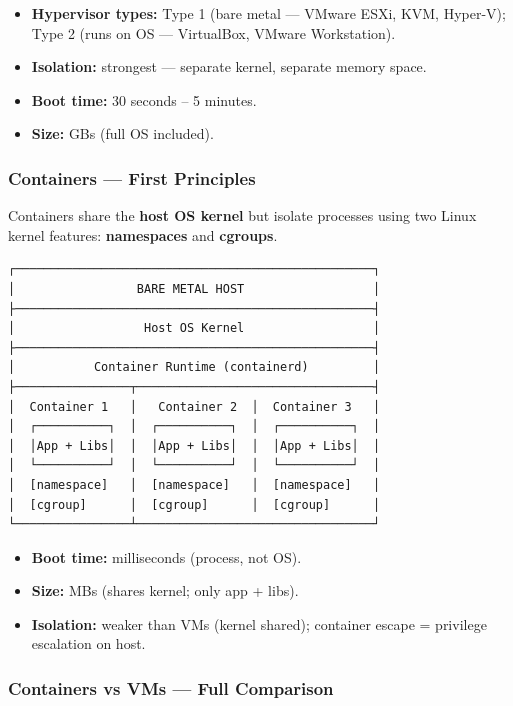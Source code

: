 \documentclass[11pt]{article}
\providecommand{\tightlist}{\setlength{\itemsep}{1pt}\setlength{\parskip}{0pt}}
\begin{document}
\begin{itemize}
\tightlist
\item
  \textbf{Hypervisor types:} Type 1 (bare metal --- VMware ESXi, KVM, Hyper-V); Type 2 (runs on OS --- VirtualBox, VMware Workstation).
\item
  \textbf{Isolation:} strongest --- separate kernel, separate memory space.
\item
  \textbf{Boot time:} 30 seconds -- 5 minutes.
\item
  \textbf{Size:} GBs (full OS included).
\end{itemize}

\subsubsection{Containers --- First Principles}\label{containers--first-principles}

Containers share the \textbf{host OS kernel} but isolate processes using two Linux kernel features: \textbf{namespaces} and \textbf{cgroups}.

\setcodelang{}

\begin{verbatim}
┌──────────────────────────────────────────────────┐
│                 BARE METAL HOST                  │
├──────────────────────────────────────────────────┤
│                  Host OS Kernel                  │
├──────────────────────────────────────────────────┤
│           Container Runtime (containerd)         │
├────────────────┬─────────────────────────────────┤
│  Container 1   │   Container 2  │  Container 3   │
│  ┌──────────┐  │  ┌──────────┐  │  ┌──────────┐  │
│  │App + Libs│  │  │App + Libs│  │  │App + Libs│  │
│  └──────────┘  │  └──────────┘  │  └──────────┘  │
│  [namespace]   │  [namespace]   │  [namespace]   │
│  [cgroup]      │  [cgroup]      │  [cgroup]      │
└────────────────┴─────────────────────────────────┘
\end{verbatim}

\begin{itemize}
\tightlist
\item
  \textbf{Boot time:} milliseconds (process, not OS).
\item
  \textbf{Size:} MBs (shares kernel; only app + libs).
\item
  \textbf{Isolation:} weaker than VMs (kernel shared); container escape = privilege escalation on host.
\end{itemize}

\subsubsection{Containers vs VMs --- Full Comparison}\label{containers-vs-vms--full-comparison}
\end{document}
